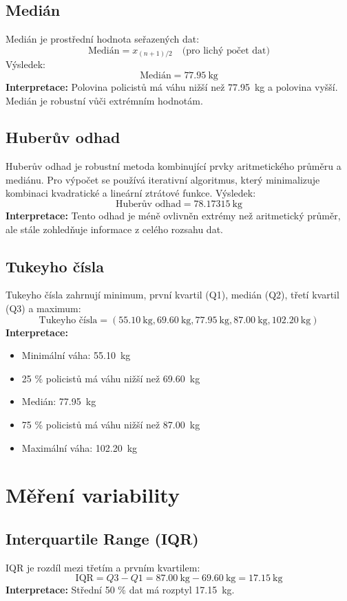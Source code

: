 \documentclass{article}
\begin{document}
\subsection{Medián}
Medián je prostřední hodnota seřazených dat:
\[
\text{Medián} = x_{(n+1)/2} \quad \text{(pro lichý počet dat)}
\]
Výsledek:
\[
\text{Medián} = \SI{77.95}{\kilo\gram}
\]
\textbf{Interpretace:} Polovina policistů má váhu nižší než \SI{77.95}{\kilo\gram} a polovina vyšší. Medián je robustní vůči extrémním hodnotám.

\subsection{Huberův odhad}
Huberův odhad je robustní metoda kombinující prvky aritmetického průměru a mediánu. Pro výpočet se používá iterativní algoritmus, který minimalizuje kombinaci kvadratické a lineární ztrátové funkce. Výsledek:
\[
\text{Huberův odhad} = \SI{78.17315}{\kilo\gram}
\]
\textbf{Interpretace:} Tento odhad je méně ovlivněn extrémy než aritmetický průměr, ale stále zohledňuje informace z celého rozsahu dat.

\subsection{Tukeyho čísla}
Tukeyho čísla zahrnují minimum, první kvartil (Q1), medián (Q2), třetí kvartil (Q3) a maximum:
\[
\text{Tukeyho čísla} = (\SI{55.10}{\kilo\gram}, \SI{69.60}{\kilo\gram}, \SI{77.95}{\kilo\gram}, \SI{87.00}{\kilo\gram}, \SI{102.20}{\kilo\gram})
\]
\textbf{Interpretace:} 
\begin{itemize}
    \item Minimální váha: \SI{55.10}{\kilo\gram}
    \item 25 \% policistů má váhu nižší než \SI{69.60}{\kilo\gram}
    \item Medián: \SI{77.95}{\kilo\gram}
    \item 75 \% policistů má váhu nižší než \SI{87.00}{\kilo\gram}
    \item Maximální váha: \SI{102.20}{\kilo\gram}
\end{itemize}

\section{Měření variability}

\subsection{Interquartile Range (IQR)}
IQR je rozdíl mezi třetím a prvním kvartilem:
\[
\text{IQR} = Q3 - Q1 = \SI{87.00}{\kilo\gram} - \SI{69.60}{\kilo\gram} = \SI{17.15}{\kilo\gram}
\]
\textbf{Interpretace:} Střední 50 \% dat má rozptyl \SI{17.15}{\kilo\gram}.
\end{document}
